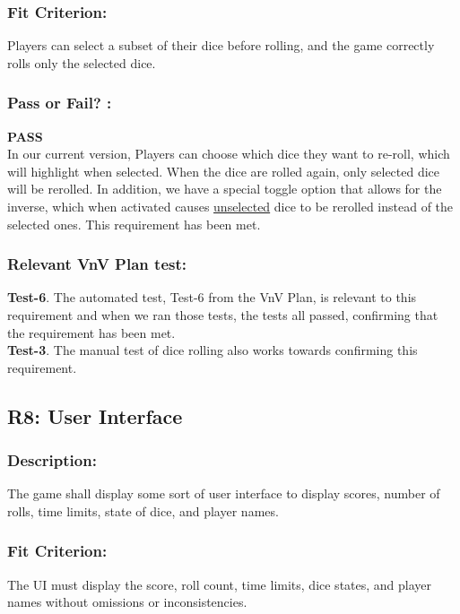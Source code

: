\documentclass[12pt, titlepage]{article}
\begin{document}
\subsubsection*{Fit Criterion:} Players can select a subset of their dice before rolling, and the game correctly rolls only the selected dice.


\subsubsection*{Pass or Fail? :} 

 \noindent \textbf{PASS}\\
 
 In our current version, Players can choose which dice they want to re-roll, which will highlight when selected. When the dice are rolled again, only selected dice will be rerolled. In addition, we have a special toggle option that allows for the inverse, which when activated causes \underline{unselected} dice to be rerolled instead of the selected ones. This requirement has been met.

\subsubsection*{Relevant VnV Plan test: } \textbf{Test-6}.  The automated test, Test-6 from the VnV Plan, is relevant to this requirement and when we ran those tests, the tests all passed, confirming that the requirement has been met.\\
\textbf{Test-3}. The manual test of dice rolling also works towards confirming this requirement.


\subsection{R8: User Interface} 
\label{R8} 

\subsubsection*{Description:}  The game shall display some sort of user interface to display scores, number of rolls, time limits, state of dice, and player names.

\subsubsection*{Fit Criterion:} The UI must display the score, roll count, time limits, dice states, and player names without omissions or inconsistencies.
\end{document}
